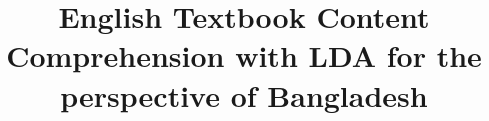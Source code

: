 \documentclass[sn-mathphys,Numbered]{sn-jnl}%
\theoremstyle{thmstyleone}%
\theoremstyle{thmstyletwo}%
\theoremstyle{thmstylethree}%
\begin{document}
\title[Article Title]{English Textbook Content Comprehension with LDA for the perspective of Bangladesh}


%
%
%

%

\end{document}
